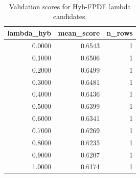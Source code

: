 \begin{table}[t]
\caption{Validation scores for Hyb-FPDE lambda candidates.}
\label{tab:lambda_distribution_computed}
\centering
\begin{tabular}{rrr}
\toprule
lambda\_hyb & mean\_score & n\_rows \\
\midrule
0.0000 & 0.6543 & 1 \\
0.1000 & 0.6506 & 1 \\
0.2000 & 0.6499 & 1 \\
0.3000 & 0.6481 & 1 \\
0.4000 & 0.6436 & 1 \\
0.5000 & 0.6399 & 1 \\
0.6000 & 0.6341 & 1 \\
0.7000 & 0.6269 & 1 \\
0.8000 & 0.6235 & 1 \\
0.9000 & 0.6207 & 1 \\
1.0000 & 0.6174 & 1 \\
\bottomrule
\end{tabular}

\end{table}
